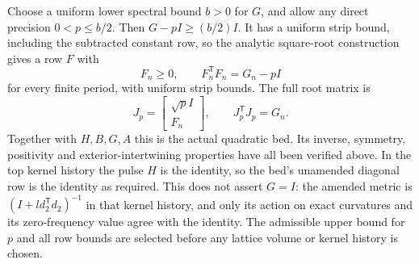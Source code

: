 Choose a uniform lower spectral bound $b>0$ for $G$, and allow
any direct precision $0<p\le b/2$. Then
$G-pI\ge(b/2)I$. It has a uniform strip bound, including the
subtracted constant row, so the analytic square-root construction
gives a row $F$ with
\[
               F_n\ge0,\qquad F_n^{\mathsf T}F_n=G_n-pI
\]
for every finite period, with uniform strip bounds. The full root
matrix is
\[
             J_p=\begin{bmatrix}\sqrt p I\\F_n\end{bmatrix},
                         \qquad J_p^{\mathsf T}J_p=G_n.
\]
Together with $H,B,G,A$ this is the actual quadratic bed. Its
inverse, symmetry, positivity and exterior-intertwining properties
have all been verified above. In the top kernel history the pulse $H$ is the identity, so the bed's
unamended diagonal row is the identity as required. This does not
assert $G=I$: the amended metric is
$(I+l d_2^{\mathsf T}d_2)^{-1}$ in that kernel history, and only its action
on exact curvatures and its zero-frequency value agree with the identity.
The admissible upper bound for $p$ and all row bounds are selected
before any lattice volume or kernel history is chosen.
